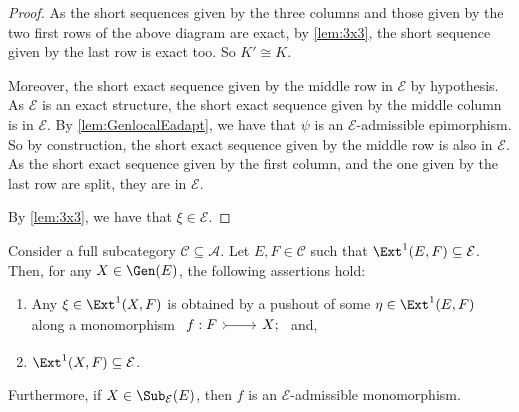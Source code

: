 \begin{proof}
As the short sequences given by the three columns and those given by the two first rows of the above diagram are exact, by \cref{lem:3x3}, the short sequence given by the last row is exact too. So $K' \cong K$. 

Moreover, the short exact sequence given by the middle row in $\mathcal{E}$ by hypothesis. As $\mathcal{E}$ is an exact structure, the short exact sequence given by the middle column is in $\mathcal{E}$. By \cref{lem:GenlocalEadapt}, we have that $\psi$ is an $\mathcal{E}$-admissible epimorphism. So by construction, the short exact sequence given by the middle row is also in $\mathcal{E}$. As the short exact sequence given by the first column, and the one given by the last row are split, they are in $\mathcal{E}$.

By \cref{lem:3x3}, we have that $\xi \in {\mathcal{E}}$. 
\end{proof}

\begin{lemma}
\label{lem:SublocalEadapt}
Consider a full subcategory $\mathscr{C} \subseteq \mathscr{A}$. Let $E,F \in \mathscr{C}$ such that $\Ext^1(E,F) \subseteq \mathcal{E}$. Then, for any $X \in \Gen(E)$, the following assertions hold:
\begin{enumerate}[label=$(\alph*)$,itemsep=1mm]
   \item Any $\xi \in \Ext^1(X,F)$ is obtained by a pushout of some $\eta \in \Ext^1(E,F)$ along a monomorphism $ \begin{tikzcd}
	 f: F & X;
	\arrow[tail,from=1-1, to=1-2]
   \end{tikzcd}$ and,
   \item $\Ext^1(X,F) \subseteq \mathcal{E}$.
\end{enumerate}
Furthermore, if $X \in \Sub_\mathcal{E}(E)$, then $f$ is an $\mathcal{E}$-admissible monomorphism.   
\end{lemma}


